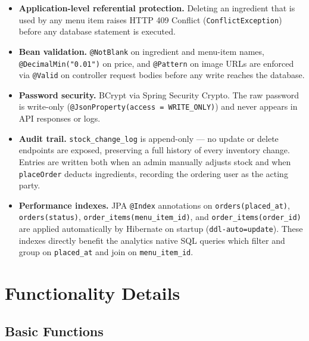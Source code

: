 \documentclass[12pt,a4paper]{article}
\begin{document}
\begin{itemize}
    \item \textbf{Application-level referential protection.} Deleting an
          ingredient that is used by any menu item raises HTTP 409 Conflict
          (\texttt{ConflictException}) before any database statement is executed.

    \item \textbf{Bean validation.} \texttt{@NotBlank} on ingredient and
          menu-item names, \texttt{@DecimalMin("0.01")} on price, and
          \texttt{@Pattern} on image URLs are enforced via \texttt{@Valid} on
          controller request bodies before any write reaches the database.

    \item \textbf{Password security.} BCrypt via Spring Security Crypto. The
          raw password is write-only (\texttt{@JsonProperty(access =
          WRITE\_ONLY)}) and never appears in API responses or logs.

    \item \textbf{Audit trail.} \texttt{stock\_change\_log} is append-only ---
          no update or delete endpoints are exposed, preserving a full history
          of every inventory change. Entries are written both when an admin
          manually adjusts stock and when \texttt{placeOrder} deducts
          ingredients, recording the ordering user as the acting party.

    \item \textbf{Performance indexes.} JPA \texttt{@Index} annotations on
          \texttt{orders(placed\_at)}, \texttt{orders(status)},
          \texttt{order\_items(menu\_item\_id)}, and
          \texttt{order\_items(order\_id)} are applied automatically by
          Hibernate on startup (\texttt{ddl-auto=update}). These indexes
          directly benefit the analytics native SQL queries which filter and
          group on \texttt{placed\_at} and join on \texttt{menu\_item\_id}.
\end{itemize}

\section{Functionality Details}

\subsection{Basic Functions}
\end{document}
